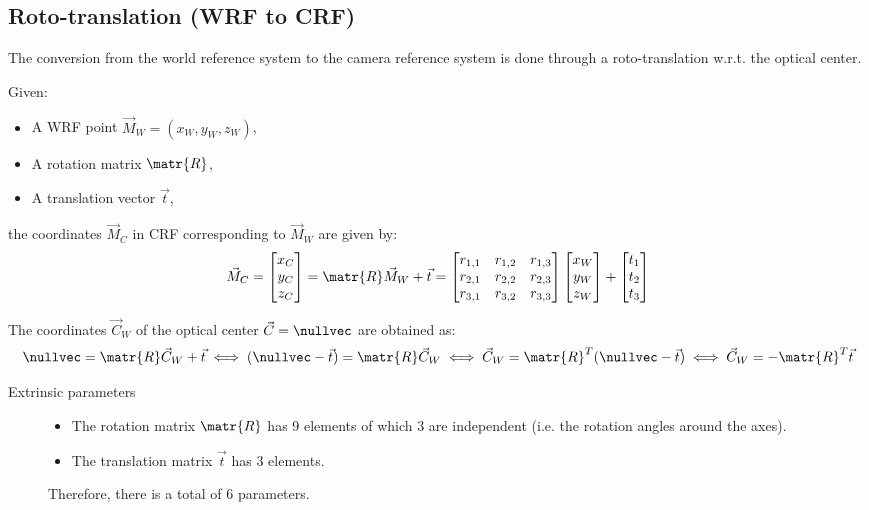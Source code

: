 \subsection{Roto-translation (WRF to CRF)}

The conversion from the world reference system to the camera reference system
is done through a roto-translation w.r.t. the optical center.

Given: 
\begin{itemize}
    \item A WRF point $\vec{M}_W = (x_W, y_W, z_W)$,
    \item A rotation matrix $\matr{R}$,
    \item A translation vector $\vec{t}$,
\end{itemize}
the coordinates $\vec{M}_C$ in CRF corresponding to $\vec{M}_W$ are given by:
\[  
    \vec{M}_C = \begin{bmatrix} x_C \\ y_C \\ z_C \end{bmatrix} =
    \matr{R}\vec{M}_W + \vec{t} =
    \begin{bmatrix}
        r_{1,1} & r_{1,2} & r_{1,3} \\
        r_{2,1} & r_{2,2} & r_{2,3} \\
        r_{3,1} & r_{3,2} & r_{3,3} \\
    \end{bmatrix}
    \begin{bmatrix}
        x_W \\ y_W \\ z_W
    \end{bmatrix}
    +
    \begin{bmatrix}
        t_1 \\ t_2 \\ t_3
    \end{bmatrix}
\]

\begin{remark}
    The coordinates $\vec{C}_W$ of the optical center $\vec{C} = \nullvec$ are obtained as:
    \[ 
        \nullvec = \matr{R}\vec{C}_W + \vec{t} 
            \iff (\nullvec - \vec{t}) = \matr{R}\vec{C}_W 
            \iff \vec{C}_W = \matr{R}^T (\nullvec - \vec{t})
            \iff \vec{C}_W = -\matr{R}^T\vec{t}
    \]
\end{remark}

\begin{description}
    \item[Extrinsic parameters] 
        \phantom{}
        \begin{itemize}
            \item The rotation matrix $\matr{R}$ has 9 elements of which 3 are independent (i.e. the rotation angles around the axes). 
            \item The translation matrix $\vec{t}$ has 3 elements.
        \end{itemize}

        Therefore, there is a total of 6 parameters.
\end{description}



